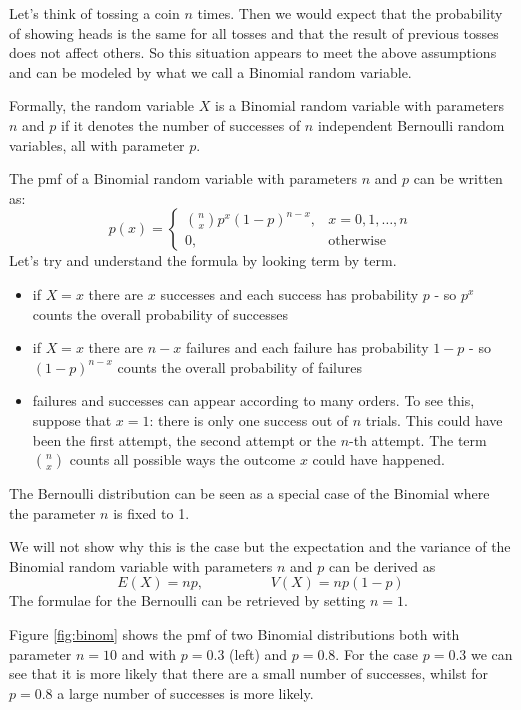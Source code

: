 \documentclass[
]{book}
\theoremstyle{definition}
\theoremstyle{definition}
\theoremstyle{definition}
\theoremstyle{definition}
\theoremstyle{remark}
\begin{document}
Let's think of tossing a coin \(n\) times. Then we would expect that the probability of showing heads is the same for all tosses and that the result of previous tosses does not affect others. So this situation appears to meet the above assumptions and can be modeled by what we call a Binomial random variable.

Formally, the random variable \(X\) is a Binomial random variable with parameters \(n\) and \(p\) if it denotes the number of successes of \(n\) independent Bernoulli random variables, all with parameter \(p\).

The pmf of a Binomial random variable with parameters \(n\) and \(p\) can be written as:
\[
p(x)=\left\{
\begin{array}{ll}
\binom{n}{x}p^{x}(1-p)^{n-x}, & x = 0,1,\dots,n\\
0, & \mbox{otherwise}
\end{array}
\right.
\]
Let's try and understand the formula by looking term by term.

\begin{itemize}
\item
  if \(X=x\) there are \(x\) successes and each success has probability \(p\) - so \(p^x\) counts the overall probability of successes
\item
  if \(X=x\) there are \(n-x\) failures and each failure has probability \(1-p\) - so \((1-p)^{n-x}\) counts the overall probability of failures
\item
  failures and successes can appear according to many orders. To see this, suppose that \(x=1\): there is only one success out of \(n\) trials. This could have been the first attempt, the second attempt or the \(n\)-th attempt. The term \(\binom{n}{x}\) counts all possible ways the outcome \(x\) could have happened.
\end{itemize}

The Bernoulli distribution can be seen as a special case of the Binomial where the parameter \(n\) is fixed to 1.

We will not show why this is the case but the expectation and the variance of the Binomial random variable with parameters \(n\) and \(p\) can be derived as
\[
E(X)=np, \hspace{2cm} V(X)=np(1-p)
\]
The formulae for the Bernoulli can be retrieved by setting \(n=1\).

Figure \ref{fig:binom} shows the pmf of two Binomial distributions both with parameter \(n=10\) and with \(p=0.3\) (left) and \(p=0.8\). For the case \(p=0.3\) we can see that it is more likely that there are a small number of successes, whilst for \(p=0.8\) a large number of successes is more likely.
\end{document}
